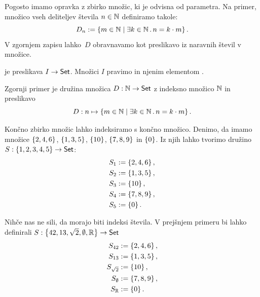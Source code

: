 Pogosto imamo opravka z zbirko množic, ki je odvisna od parametra. Na primer, množico vseh deliteljev števila $n \in \mathbb{N}$ definiramo takole:
%
\begin{equation*}
  D_n \mathrel{{:}{=}} \left\{m \in \mathbb{N} \; \middle| \; \exists k \in \mathbb{N} \,.\, n = k \cdot m\right\}.
\end{equation*}
%
V zgornjem zapisu lahko~$D$ obravnavamo kot preslikavo iz naravnih števil v množice.

\begin{definicija}
  \label{def:druzina-mnozic}
   je preslikava $I \to \mathsf{Set}$. Množici $I$ pravimo  in njenim elementom .
\end{definicija}


\begin{zgled}
  Zgornji primer je družina množica $D : \mathbb{N} \to \mathsf{Set}$ z indeksno množico $\mathbb{N}$ in preslikavo
  \begin{equation*}
    D : n \mapsto \left\{m \in \mathbb{N} \; \middle| \; \exists k \in \mathbb{N} \,.\, n = k \cdot m\right\}.
  \end{equation*}
\end{zgled}

\begin{zgled}
  Končno zbirko množic lahko indeksiramo s končno množico. Denimo, da imamo
  množice $\left\{2, 4, 6\right\}$, $\left\{1, 3, 5\right\}$, $\left\{10\right\}$, $\left\{7, 8, 9\right\}$ in $\left\{0\right\}$. Iz njih lahko tvorimo družino $S : \left\{1, 2, 3, 4, 5\right\} \to \mathsf{Set}$:
  \begin{align*}
  S_1 &\mathrel{{:}{=}} \left\{2, 4, 6\right\},\\
  S_2 &\mathrel{{:}{=}} \left\{1, 3, 5\right\},\\
  S_3 &\mathrel{{:}{=}} \left\{10\right\},\\
  S_4 &\mathrel{{:}{=}} \left\{7, 8, 9\right\},\\
  S_5 &\mathrel{{:}{=}} \left\{0\right\}.
  \end{align*}
\end{zgled}

\begin{zgled}
  Nihče nas ne sili, da morajo biti indeksi števila. V prejšnjem primeru bi lahko
  definirali $S : \left\{42, 13, \sqrt{2}, \emptyset, \mathbb{R}\right\} \to \mathsf{Set}$
  \begin{align*}
  S_{42} &\mathrel{{:}{=}} \left\{2, 4, 6\right\},\\
  S_{13} &\mathrel{{:}{=}} \left\{1, 3, 5\right\},\\
  S_{\sqrt{2}} &\mathrel{{:}{=}} \left\{10\right\},\\
  S_{\emptyset} &\mathrel{{:}{=}} \left\{7, 8, 9\right\},\\
  S_{\mathbb{R}} &\mathrel{{:}{=}} \left\{0\right\}.
  \end{align*}
\end{zgled}

